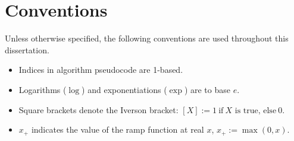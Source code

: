 \chapter*{Conventions}
Unless otherwise specified, the following conventions are used throughout this dissertation.

\begin{itemize}
  \item Indices in algorithm pseudocode are 1-based.
  \item Logarithms ($\log$) and exponentiations ($\exp$) are to base $e$.
  \item Square brackets denote the Iverson bracket: $\left[X\right] := 1\ \mbox{if}\ X \mbox{ is true, else}\ 0$.
  \item $x_+$ indicates the value of the ramp function at real $x$, $x_+ := \max(0, x)$.
\end{itemize}
